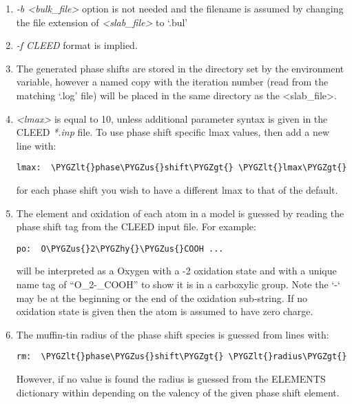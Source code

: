 \documentclass[letterpaper,10pt,english]{sphinxmanual}
\def\PYGZus{\char`\_}
\def\PYGZlt{\char`\<}
\def\PYGZgt{\char`\>}
\def\PYGZhy{\char`\-}
\begin{document}
\begin{enumerate}
\item {} 
\emph{-b \textless{}bulk\_file\textgreater{}} option is not needed and the filename is assumed by
changing the file extension of \emph{\textless{}slab\_file\textgreater{}} to `.bul'

\item {} 
\emph{-f CLEED} format is implied.

\item {} 
The generated phase shifts are stored in the directory set by the
 environment variable, however a named copy with the
iteration number (read from the matching `.log' file) will be placed in the
same directory as the \textless{}slab\_file\textgreater{}.

\item {} 
\emph{\textless{}lmax\textgreater{}} is equal to 10, unless additional parameter syntax is given in the CLEED
\emph{*.inp} file. To use phase shift specific lmax values, then add a new line with:

\begin{Verbatim}[commandchars=\\\{\}]
lmax:  \PYGZlt{}phase\PYGZus{}shift\PYGZgt{} \PYGZlt{}lmax\PYGZgt{}
\end{Verbatim}

for each phase shift you wish to have a different lmax to that of the default.

\item {} 
The element and oxidation of each atom in a model is guessed by reading the phase
shift tag from the CLEED input file. For example:

\begin{Verbatim}[commandchars=\\\{\}]
po:  O\PYGZus{}2\PYGZhy{}\PYGZus{}COOH ...
\end{Verbatim}

will be interpreted as a Oxygen with a -2 oxidation state and with a unique name
tag of ``O\_2-\_COOH'' to show it is in a carboxylic group. Note the `-` may be at
the beginning or the end of the oxidation sub-string. If no oxidation state is
given then the atom is assumed to have zero charge.

\item {} 
The muffin-tin radius of the phase shift species is guessed from lines with:

\begin{Verbatim}[commandchars=\\\{\}]
rm:  \PYGZlt{}phase\PYGZus{}shift\PYGZgt{} \PYGZlt{}radius\PYGZgt{}
\end{Verbatim}

However, if no value is found the radius is guessed from the
ELEMENTS dictionary within {\hyperref[modules:module-phaseshifts.elements]{}} depending on the
valency of the given phase shift element.

\end{enumerate}
\end{document}
